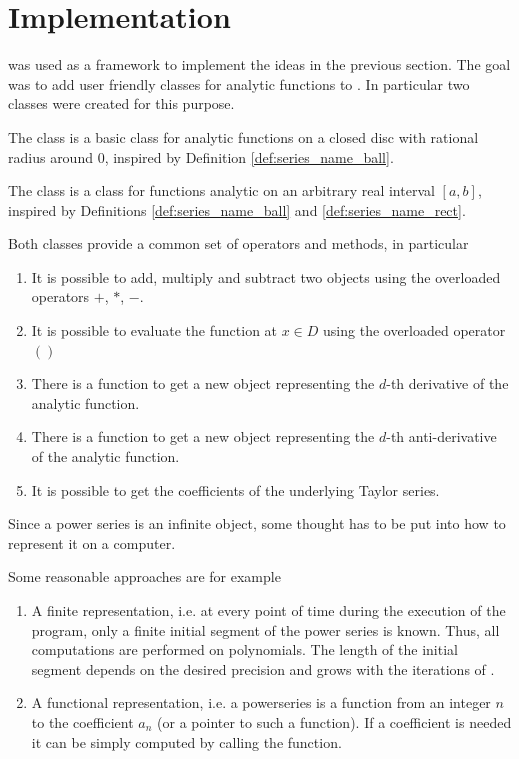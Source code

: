	\section{Implementation}
		\irram was used as a framework to implement the ideas in the previous section.
		The goal was to add user friendly classes for analytic functions to \irram.
		In particular two classes were created for this purpose.

		The class \baana is a basic class for analytic functions on 
		a closed disc with rational radius around $0$, inspired by Definition \ref{def:series_name_ball}.

		The class \anarect is a class for functions analytic on an arbitrary real interval $[a,b]$, 
		inspired by Definitions \ref{def:series_name_ball} and \ref{def:series_name_rect}.

		Both classes provide a common set of operators and methods, in particular
		\begin{enumerate}
			\item It is possible to add, multiply and subtract two objects using the overloaded operators $+$, $*$, $-$.
			\item It is possible to evaluate the function at $x \in D$ using the overloaded operator $()$
			\item There is a function  to get a new object representing the $d$-th derivative of the analytic function.
			\item There is a function  to get a new object representing the $d$-th anti-derivative of the analytic function.
			\item It is possible to get the coefficients of the underlying Taylor series.
		\end{enumerate}

    Since a power series is an infinite object, some thought has to be put into how to represent it on a computer.

    Some reasonable approaches are for example
		\begin{enumerate}
			\item A finite representation, i.e. at every point of time during the execution of the program, 
			only a finite initial segment of the power series is known. 
			Thus, all computations are performed on polynomials. 
			The length of the initial segment depends on the desired precision and grows 
			with the iterations of \irram.
			\item A functional representation, i.e. a powerseries is a function from an integer $n$ to the coefficient
			$a_n$ (or a pointer to such a function). If a coefficient is needed it can be simply computed by calling the function.
		\end{enumerate}
		

